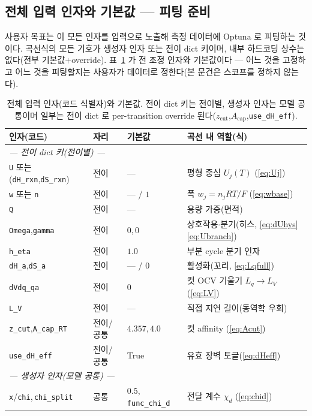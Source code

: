 \documentclass[11pt,a4paper]{article}
\newcommand{\code}[1]{\texttt{#1}}
\begin{document}
\subsection{전체 입력 인자와 기본값 — 피팅 준비}
사용자 목표는 이 모든 인자를 입력으로 노출해 측정 데이터에 Optuna 로 피팅하는 것이다. 곡선식의 모든 기호가 생성자 인자
또는 전이 dict 키이며, 내부 하드코딩 상수는 없다(전부 기본값$+$override). 표~\ref{tab:inputs} 가 전 조정 인자와
기본값이다 — 어느 것을 고정하고 어느 것을 피팅할지는 사용자가 데이터로 정한다(본 문건은 스코프를 정하지 않는다).

\begin{table}[t]
\centering\footnotesize
\renewcommand{\arraystretch}{1.18}
\caption{전체 입력 인자(코드 식별자)와 기본값. 전이 dict 키는 전이별, 생성자 인자는 모델 공통이며 일부는 전이 dict 로
per-transition override 된다($z_\mathrm{cut}$,$A_\mathrm{cap}$,\code{use\_dH\_eff}).}
\label{tab:inputs}
\begin{tabular}{l l l l}
\toprule
인자(코드) & 자리 & 기본값 & 곡선 내 역할(식) \\
\midrule
\multicolumn{4}{l}{\emph{— 전이 dict 키(전이별) —}}\\
\code{U} 또는 (\code{dH\_rxn},\code{dS\_rxn}) & 전이 & --- & 평형 중심 $U_j(T)$ (\eqref{eq:Uj}) \\
\code{w} 또는 \code{n} & 전이 & --- / $1$ & 폭 $w_j=n_jRT/F$ (\eqref{eq:wbase}) \\
\code{Q} & 전이 & --- & 용량 가중(면적) \\
\code{Omega},\code{gamma} & 전이 & $0$,\,$0$ & 상호작용$\cdot$분기(히스, \eqref{eq:dUhys}\eqref{eq:Ubranch}) \\
\code{h\_eta} & 전이 & $1.0$ & 부분 cycle 분기 인자 \\
\code{dH\_a},\code{dS\_a} & 전이 & --- / $0$ & 활성화(꼬리, \eqref{eq:Lqfull}) \\
\code{dVdq\_qa} & 전이 & $0$ & 컷 OCV 기울기 $L_q\!\to\!L_V$ (\eqref{eq:LV}) \\
\code{L\_V} & 전이 & --- & 직접 지연 길이(동역학 우회) \\
\code{z\_cut},\code{A\_cap\_RT} & 전이/공통 & $4.357$,\,$4.0$ & 컷 affinity (\eqref{eq:Acut}) \\
\code{use\_dH\_eff} & 전이/공통 & True & 유효 장벽 토글(\eqref{eq:dHeff}) \\
\multicolumn{4}{l}{\emph{— 생성자 인자(모델 공통) —}}\\
\code{x}/\code{chi},\,\code{chi\_split} & 공통 & $0.5$,\,\code{func\_chi\_d} & 전달 계수 $\chi_d$ (\eqref{eq:chid}) \\

\end{tabular}
\end{table}
\end{document}
